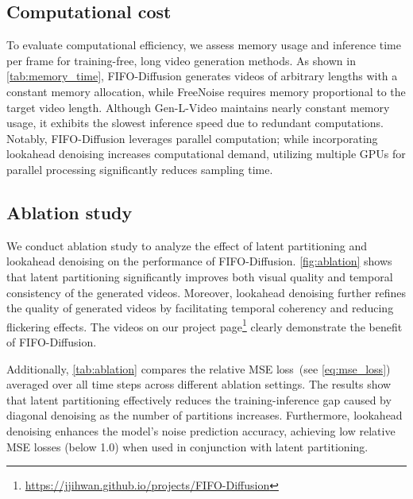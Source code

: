 \subsection{Computational cost}
\label{subsec:memory_time}

To evaluate computational efficiency, we assess memory usage and inference time per frame for training-free, long video generation methods. 
As shown in \cref{tab:memory_time}, FIFO-Diffusion generates videos of arbitrary lengths with a constant memory allocation, while FreeNoise requires memory proportional to the target video length. 
Although Gen-L-Video maintains nearly constant memory usage, it exhibits the slowest inference speed due to redundant computations. 
Notably, FIFO-Diffusion leverages parallel computation; while incorporating lookahead denoising increases computational demand, utilizing multiple GPUs for parallel processing significantly reduces sampling time.
%




\subsection{Ablation study}
\label{subsec:ablation}

We conduct ablation study to analyze the effect of latent partitioning and lookahead denoising on the performance of FIFO-Diffusion.
\cref{fig:ablation} shows that latent partitioning significantly improves both visual quality and temporal consistency of the generated videos.
Moreover, lookahead denoising further refines the quality of generated videos by facilitating temporal coherency and reducing flickering effects.
The videos on our project page\footnote{\url{https://jjihwan.github.io/projects/FIFO-Diffusion}} clearly demonstrate the benefit of FIFO-Diffusion.

Additionally, \cref{tab:ablation} compares the relative MSE loss~(see \cref{eq:mse_loss}) averaged over all time steps across different ablation settings.
The results show that latent partitioning effectively reduces the training-inference gap caused by diagonal denoising as the number of partitions increases.
Furthermore, lookahead denoising enhances the model's noise prediction accuracy, achieving low relative MSE losses (below 1.0) when used in conjunction with latent partitioning.


